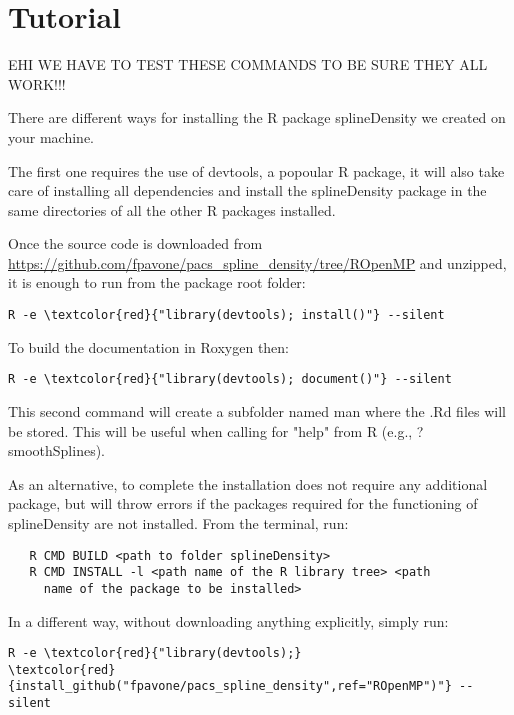 \chapter{Tutorial}
\label{tutorial}

EHI WE HAVE TO TEST THESE COMMANDS TO BE SURE THEY ALL WORK!!!

\noindent 
There are different ways for installing the R package splineDensity we created on your machine.

The first one requires the use of devtools, a popoular R package, it will also take care of installing all dependencies and install the splineDensity package in the same directories of all the other R packages installed. 

Once the source code is downloaded from \url{https://github.com/fpavone/pacs_spline_density/tree/ROpenMP} and unzipped, it is enough to run from the package root folder:
\begin{Verbatim}[commandchars=\\\{\}]
   R -e \textcolor{red}{"library(devtools); install()"} --silent
\end{Verbatim}
To build the documentation in Roxygen then:
\begin{Verbatim}[commandchars=\\\{\}]
   R -e \textcolor{red}{"library(devtools); document()"} --silent
\end{Verbatim}

This second command will create a subfolder named man where the .Rd files will be stored. This will be useful when calling for "help" from R (e.g., ?smoothSplines).

As an alternative, to complete the installation does not require any additional package, but will throw errors if the packages required for the functioning of splineDensity are not installed.
From the terminal, run:
\begin{verbatim}
   R CMD BUILD <path to folder splineDensity>
   R CMD INSTALL -l <path name of the R library tree> <path 
     name of the package to be installed>
\end{verbatim}

In a different way, without downloading anything explicitly, simply run:
\begin{Verbatim}[commandchars=\\\{\}]
   R -e \textcolor{red}{"library(devtools);} 
\textcolor{red}{install_github("fpavone/pacs_spline_density",ref="ROpenMP")"} --silent
\end{Verbatim}

